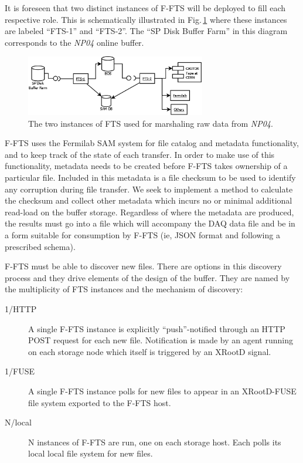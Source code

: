\documentclass[pdftex,12pt,letter]{article}
\newcommand{\xrd}{XRootD\xspace}
\newcommand{\expname}{\textit{NP04}\xspace}
\begin{document}
\noindent It is foreseen that two distinct instances of F-FTS will be deployed to fill each
respective role. This is schematically illustrated in Fig.\,\ref{fig:ftsinstances} where these instances are labeled ``FTS-1'' and ``FTS-2''.
The ``SP Disk Buffer Farm'' in this diagram corresponds to the \expname online buffer.

\begin{figure}[tbh]
  \centering
  \includegraphics[width=0.7\textwidth]{figures/ftsinstances_v2.png}
  \caption{The two instances of FTS used for marshaling raw data from \expname.}
  \label{fig:ftsinstances}
\end{figure}

F-FTS uses the Fermilab SAM system for file catalog and metadata functionality,
and to keep track of the state of each transfer. 
In order to make use of this functionality, metadata
needs to be created before F-FTS takes ownership of a particular file. 
Included in this metadata is a file checksum to be used to identify any corruption during file transfer.
We seek to implement a method to calculate the checksum and collect other metadata which incurs no or minimal additional read-load on the buffer storage.  
Regardless of where the metadata are produced, the results must go into a file which will accompany the DAQ data file and be in a form suitable for consumption by F-FTS (ie, JSON format and following a prescribed schema).

F-FTS must be able to discover new files.  There are options in this
discovery process and they drive elements of the design of the buffer.
They are named by the multiplicity of FTS instances and the mechanism
of discovery:

\begin{description}
\item[1/HTTP] A single F-FTS instance is explicitly ``push''-notified
  through an HTTP POST request for each new file.  Notification is
  made by an agent running on each storage node which itself is
  triggered by an \xrd signal.
\item[1/FUSE] A single F-FTS instance polls for new files to appear in
  an \xrd-FUSE file system exported to the F-FTS host.
\item[N/local] N instances of F-FTS are run, one on each storage host.
  Each polls its local local file system for new files.
\end{description}
\end{document}
